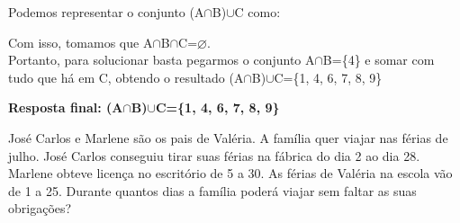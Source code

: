 \begin{solution}{}{}
    Podemos representar o conjunto (A$\cap$B)$\cup$C como:
    
    
    Com isso, tomamos que A$\cap$B$\cap$C=$\varnothing$. \\
    Portanto, para solucionar basta pegarmos o conjunto A$\cap$B=\{{4}\} e somar com tudo que há em C, obtendo o resultado (A$\cap$B)$\cup$C=\{{1, 4, 6, 7, 8, 9}\}

    \textbf{Resposta final: (A$\cap$B)$\cup$C=\{{1, 4, 6, 7, 8, 9}\}}
\end{solution}

\newpage

\begin{problem}{}{}
José Carlos e Marlene são os pais de Valéria. A família quer viajar nas férias de julho. José Carlos
conseguiu tirar suas férias na fábrica do dia 2 ao dia 28. Marlene obteve licença no escritório de 5 a
30. As férias de Valéria na escola vão de 1 a 25. Durante quantos dias a família poderá viajar sem
faltar as suas obrigações?
\end{problem}

